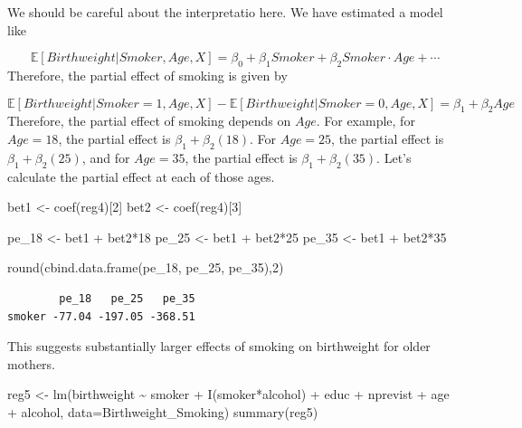 \documentclass[
  letterpaper,
  DIV=11,
  numbers=noendperiod]{scrreprt}
\newenvironment{Shaded}{\begin{snugshade}}{\end{snugshade}}
\newcommand{\AttributeTok}[1]{\textcolor[rgb]{0.40,0.45,0.13}{#1}}
\newcommand{\DecValTok}[1]{\textcolor[rgb]{0.68,0.00,0.00}{#1}}
\newcommand{\FunctionTok}[1]{\textcolor[rgb]{0.28,0.35,0.67}{#1}}
\newcommand{\NormalTok}[1]{\textcolor[rgb]{0.00,0.23,0.31}{#1}}
\newcommand{\OtherTok}[1]{\textcolor[rgb]{0.00,0.23,0.31}{#1}}
\newcommand{\SpecialCharTok}[1]{\textcolor[rgb]{0.37,0.37,0.37}{#1}}
\begin{document}
We should be careful about the interpretatio here. We have estimated a
model like

\[
  \mathbb{E}[Birthweight|Smoker, Age, X] = \beta_0 + \beta_1 Smoker + \beta_2 Smoker \cdot Age + \cdots
\] Therefore, the partial effect of smoking is given by

\[
  \mathbb{E}[Birthweight | Smoker=1, Age, X] - \mathbb{E}[Birthweight | Smoker=0, Age, X] = \beta_1 + \beta_2 Age
\] Therefore, the partial effect of smoking depends on \(Age\). For
example, for \(Age=18\), the partial effect is
\(\beta_1 + \beta_2 (18)\). For \(Age=25\), the partial effect is
\(\beta_1 + \beta_2 (25)\), and for \(Age=35\), the partial effect is
\(\beta_1 + \beta_2 (35)\). Let's calculate the partial effect at each
of those ages.

\begin{Shaded}
\begin{Highlighting}[]
\NormalTok{bet1 }\OtherTok{\textless{}{-}} \FunctionTok{coef}\NormalTok{(reg4)[}\DecValTok{2}\NormalTok{]}
\NormalTok{bet2 }\OtherTok{\textless{}{-}} \FunctionTok{coef}\NormalTok{(reg4)[}\DecValTok{3}\NormalTok{]}

\NormalTok{pe\_18 }\OtherTok{\textless{}{-}}\NormalTok{ bet1 }\SpecialCharTok{+}\NormalTok{ bet2}\SpecialCharTok{*}\DecValTok{18}
\NormalTok{pe\_25 }\OtherTok{\textless{}{-}}\NormalTok{ bet1 }\SpecialCharTok{+}\NormalTok{ bet2}\SpecialCharTok{*}\DecValTok{25}
\NormalTok{pe\_35 }\OtherTok{\textless{}{-}}\NormalTok{ bet1 }\SpecialCharTok{+}\NormalTok{ bet2}\SpecialCharTok{*}\DecValTok{35}

\FunctionTok{round}\NormalTok{(}\FunctionTok{cbind.data.frame}\NormalTok{(pe\_18, pe\_25, pe\_35),}\DecValTok{2}\NormalTok{)}
\end{Highlighting}
\end{Shaded}

\begin{verbatim}
        pe_18   pe_25   pe_35
smoker -77.04 -197.05 -368.51
\end{verbatim}

This suggests substantially larger effects of smoking on birthweight for
older mothers.

\begin{Shaded}
\begin{Highlighting}[]
\NormalTok{reg5 }\OtherTok{\textless{}{-}} \FunctionTok{lm}\NormalTok{(birthweight }\SpecialCharTok{\textasciitilde{}}\NormalTok{ smoker }\SpecialCharTok{+} \FunctionTok{I}\NormalTok{(smoker}\SpecialCharTok{*}\NormalTok{alcohol) }\SpecialCharTok{+}\NormalTok{ educ }\SpecialCharTok{+}\NormalTok{ nprevist }\SpecialCharTok{+}\NormalTok{ age }\SpecialCharTok{+}\NormalTok{ alcohol,}
           \AttributeTok{data=}\NormalTok{Birthweight\_Smoking)}
\FunctionTok{summary}\NormalTok{(reg5)}
\end{Highlighting}
\end{Shaded}
\end{document}
